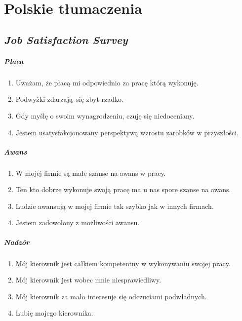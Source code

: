 \appendix
\chapter{Polskie tłumaczenia}

\section{\emph{Job Satisfaction Survey}}
\label{sec:jss-text}
\paragraph{Płaca}
\begin{enumerate}
  \item Uważam, że płacą mi odpowiednio za pracę którą wykonuję.
  \item Podwyżki zdarzają się zbyt rzadko.
  \item Gdy myślę o swoim wynagrodzeniu, czuję się niedoceniany.
  \item Jestem usatysfakcjonowany perspektywą wzrostu zarobków w przyszłości.
\end{enumerate}

\paragraph{Awans}
\begin{enumerate}
  \item W mojej firmie są małe szanse na awans w pracy.
  \item Ten kto dobrze wykonuje swoją pracę ma u nas spore szanse na awans.
  \item Ludzie awansują w mojej firmie tak szybko jak w innych firmach.
  \item Jestem zadowolony z możliwości awansu.
\end{enumerate}

\paragraph{Nadzór}
\begin{enumerate}
  \item Mój kierownik jest całkiem kompetentny w wykonywaniu swojej pracy.
  \item Mój kierownik jest wobec mnie niesprawiedliwy.
  \item Mój kierownik za mało interesuje się odczuciami podwładnych.
  \item Lubię mojego kierownika.
\end{enumerate}

